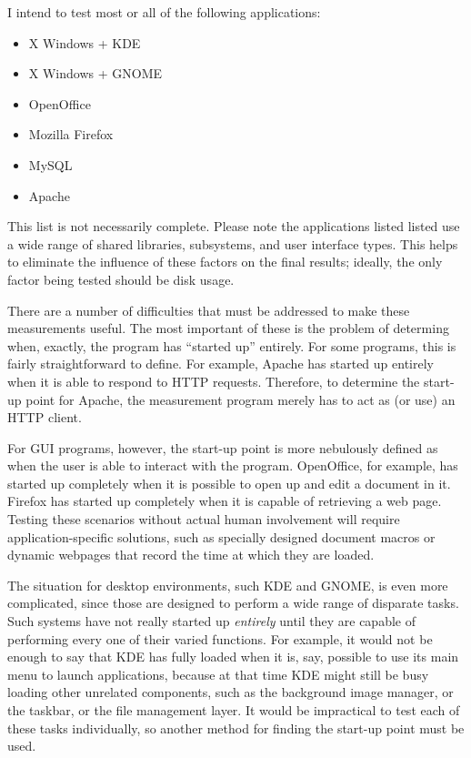 \documentclass[10pt]{article}
\begin{document}
I intend to test most or all of the following applications:
\begin{itemize}
\item X Windows + KDE
\item X Windows + GNOME
\item OpenOffice
\item Mozilla Firefox
\item MySQL
\item Apache
\end{itemize}
This list is not necessarily complete. Please note the applications listed
listed use a wide range of shared libraries, subsystems, and user interface types.
This helps to eliminate the influence of these factors on the final results;
ideally, the only factor being tested should be disk usage.

There are a number of difficulties that must be addressed to make these measurements useful.
The most important of these is the problem of determing when, exactly, the program has
``started up'' entirely. For some programs, this is fairly straightforward to define. For example,
Apache has started up entirely when it is able to respond to HTTP requests. Therefore,
to determine the start-up point for Apache, the measurement program merely has to act
as (or use) an HTTP client.

For GUI programs, however, the start-up point is more nebulously defined as when the user is
able to interact with the program. OpenOffice, for example, has started up completely when it is possible to open up and edit a document in it. Firefox has started up completely when it is capable of retrieving a web page. Testing these scenarios without actual human involvement will require application-specific solutions, such as
specially designed document macros or dynamic webpages that record the time at which they are loaded.

The situation for desktop environments, such KDE and GNOME, is even more complicated, since those are designed
to perform a wide range of disparate tasks. Such systems have not really started up \emph{entirely} until they are capable of performing every one of their varied functions. For example, it would not be enough to say that KDE has fully loaded when it is, say, possible to use its main menu to launch applications, because at that time KDE might still be busy loading other unrelated components, such as the background image manager, or the taskbar, or
the file management layer. It would be impractical to test each of these tasks individually,
so another method for finding the start-up point must be used.
\end{document}
